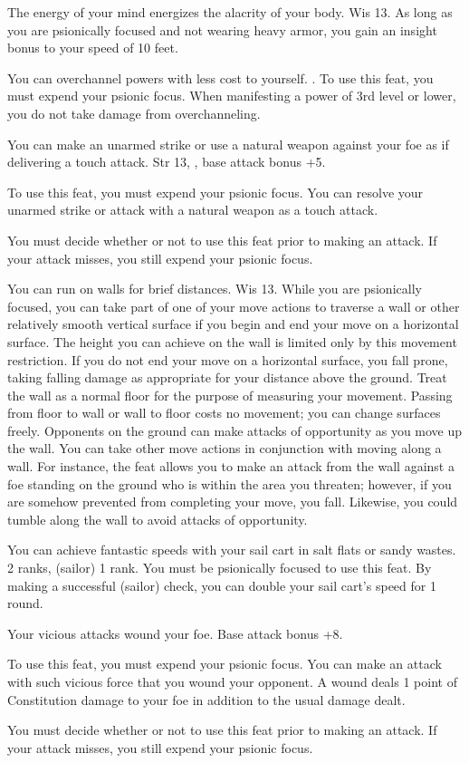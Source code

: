{The energy of your mind energizes the alacrity of your body.}
{Wis 13.}
{As long as you are psionically focused and not wearing heavy armor, you gain an insight bonus to your speed of 10 feet.}
{}{}

{You can overchannel powers with less cost to yourself.}
{.}
{To use this feat, you must expend your psionic focus. When manifesting a power of 3rd level or lower, you do not take damage from overchanneling.}
{}{}

{You can make an unarmed strike or use a natural weapon against your foe as if delivering a touch attack.}
{Str 13, , base attack bonus +5.}
{To use this feat, you must expend your psionic focus. You can resolve your unarmed strike or attack with a natural weapon as a touch attack.

You must decide whether or not to use this feat prior to making an attack. If your attack misses, you still expend your psionic focus.}
{}{}

{You can run on walls for brief distances.}
{Wis 13.}
{While you are psionically focused, you can take part of one of your move actions to traverse a wall or other relatively smooth vertical surface if you begin and end your move on a horizontal surface. The height you can achieve on the wall is limited only by this movement restriction. If you do not end your move on a horizontal surface, you fall prone, taking falling damage as appropriate for your distance above the ground. Treat the wall as a normal floor for the purpose of measuring your movement. Passing from floor to wall or wall to floor costs no movement; you can change surfaces freely. Opponents on the ground can make attacks of opportunity as you move up the wall.}
{}
{You can take other move actions in conjunction with moving along a wall. For instance, the  feat allows you to make an attack from the wall against a foe standing on the ground who is within the area you threaten; however, if you are somehow prevented from completing your move, you fall. Likewise, you could tumble along the wall to avoid attacks of opportunity.}

{You can achieve fantastic speeds with your sail cart in salt flats or sandy wastes.}
{ 2 ranks,  (sailor) 1 rank.}
{You must be psionically focused to use this feat. By making a successful  (sailor) check, you can double your sail cart's speed for 1 round.}
{}{}

{Your vicious attacks wound your foe.}
{Base attack bonus +8.}
{To use this feat, you must expend your psionic focus. You can make an attack with such vicious force that you wound your opponent. A wound deals 1 point of Constitution damage to your foe in addition to the usual damage dealt.

You must decide whether or not to use this feat prior to making an attack. If your attack misses, you still expend your psionic focus.}
{}{}
